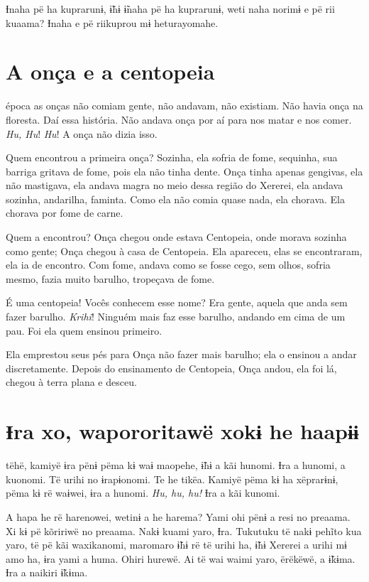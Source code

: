 Ɨnaha pë ha kuprarunɨ, ɨ̃hɨ ɨ̃naha pë ha kuprarunɨ, weti naha norimɨ e pë
rii kuaama? Ɨnaha e pë riikuprou mɨ heturayomahe. 

 
\chapter{A onça e a centopeia}
 
 época as onças não comiam gente, não andavam, não existiam. Não
havia onça na floresta. Daí essa história. Não andava onça por aí para nos
matar e nos comer. \textit{Hu, Hu}! \textit{Hu}! A onça não dizia isso. 

Quem encontrou a primeira onça? Sozinha, ela sofria de fome, sequinha,
sua barriga gritava de fome, pois ela não tinha dente. Onça tinha apenas
gengivas, ela não mastigava, ela andava magra no meio dessa região do
Xererei, ela andava sozinha, andarilha, faminta. Como ela não comia quase
nada, ela chorava. Ela chorava por fome de carne. 

Quem a encontrou? Onça chegou onde estava Centopeia, onde morava
sozinha como gente; Onça chegou à casa de Centopeia. Ela apareceu, elas
se encontraram, ela ia de encontro. Com fome, andava como se fosse cego,
sem olhos, sofria mesmo, fazia muito barulho, tropeçava de fome. 

É uma centopeia! Vocês conhecem esse nome? Era gente, aquela que anda
sem fazer barulho. \textit{Krihi}! Ninguém mais faz esse barulho, andando em cima de um pau.
Foi ela quem ensinou primeiro. 

Ela emprestou seus pés para Onça não fazer mais barulho; ela o ensinou a
andar discretamente. Depois do ensinamento de Centopeia, Onça andou, ela
foi lá, chegou à terra plana e desceu.

\chapter[Ɨra xo, wapororitawë xo kɨ he haapɨɨ]{Ɨra xo, wapororitawë xo\break kɨ he haapɨɨ}

 
 tëhë, kamiyë ɨra pënɨ pëma kɨ waɨ maopehe, ɨ̃hɨ a kãi hunomi. Ɨra a
hunomi, a kuonomi. Të urihi no ɨrapɨonomi. Te he tikëa. Kamiyë pëma kɨ
ha xëprarɨnɨ, pëma kɨ rë waɨwei, ɨra a hunomi. \textit{Hu, hu, hu!} Ɨra a kãi
kunomi. 

A hapa he rë harenowei, wetinɨ a he harema? Yami ohi pënɨ a resi no
preaama. Xi kɨ pë kõririwë no preaama. Nakɨ kuami yaro, Ɨra. Tukutuku të
nakɨ pehĩto kua yaro, të pë kãi waxikanomi, maromaro ɨ̃hɨ rë të urihi ha,
ɨ̃hɨ Xererei a urihi mɨ amo ha, ɨra yami a huma. Ohiri hurewë. Ai të wai
waimi yaro, ërëkëwë, a ɨ̃kɨma. Ɨra a naikiri ɨ̃kɨma. 

